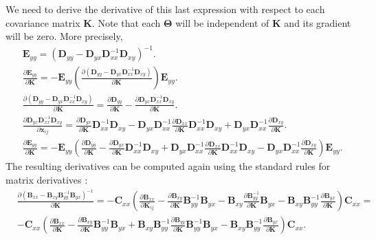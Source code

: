 We need to derive the derivative of this last expression with respect to each covariance matrix $\mathbf{K}$. Note that each $\mathbf{\Theta}$ will be independent of $\mathbf{K}$ and its gradient will be zero. 
More precisely, 
\begin{align}
& \mathbf{E}_{yy} = (\mathbf{D}_{yy}-\mathbf{D}_{yx}\mathbf{D}_{xx}^{-1}\mathbf{D}_{xy})^{-1}. \\
& \frac{\partial \mathbf{E}_{yy}}{\partial \mathbf{K}} = - \mathbf{E}_{yy} ( \frac{\partial (\mathbf{D}_{yy}-\mathbf{D}_{yx}\mathbf{D}_{xx}^{-1}\mathbf{D}_{xy})} {\partial \mathbf{K}}) \mathbf{E}_{yy}. \\
& \frac{\partial (\mathbf{D}_{yy}-\mathbf{D}_{yx}\mathbf{D}_{xx}^{-1}\mathbf{D}_{xy})} {\partial \mathbf{K}} = \frac{\partial \mathbf{D}_{yy}}{\partial \mathbf{K}} - \frac{\partial \mathbf{D}_{yx}\mathbf{D}_{xx}^{-1}\mathbf{D}_{xy}}{\partial \mathbf{K}}. \\
& \frac{\partial \mathbf{D}_{yx}\mathbf{D}_{xx}^{-1}\mathbf{D}_{xy}}{\partial \mathbf{x}_{ij}} = \frac{\partial \mathbf{D}_{yx}}{\partial \mathbf{K}} \mathbf{D}_{xx}^{-1}\mathbf{D}_{xy} - \mathbf{D}_{yx} \mathbf{D}_{xx}^{-1} \frac{\partial \mathbf{D}_{xx}}{\partial \mathbf{K}}\mathbf{D}_{xx}^{-1}\mathbf{D}_{xy}+ \mathbf{D}_{yx}\mathbf{D}_{xx}^{-1}\frac{\partial \mathbf{D}_{xy}}{\partial \mathbf{K}}. \\
& \frac{\partial \mathbf{E}_{yy}}{\partial \mathbf{K}} = - \mathbf{E}_{yy} (\frac{\partial \mathbf{D}_{yy}}{\partial \mathbf{K}} - \frac{\partial \mathbf{D}_{yx}}{\partial \mathbf{K}} \mathbf{D}_{xx}^{-1}\mathbf{D}_{xy} + \mathbf{D}_{yx} \mathbf{D}_{xx}^{-1} \frac{\partial \mathbf{D}_{xx}}{\partial \mathbf{K}}\mathbf{D}_{xx}^{-1}\mathbf{D}_{xy} - \mathbf{D}_{yx}\mathbf{D}_{xx}^{-1}\frac{\partial \mathbf{D}_{xy}}{\partial \mathbf{K}}) \mathbf{E}_{yy}.
\end{align}
The resulting derivatives can be computed again using the standard rules for matrix derivatives \cite{petersen2012}:
\begin{align}
& \frac{\partial (\mathbf{B}_{xx}-\mathbf{B}_{xy}\mathbf{B}_{yy}^{-1}\mathbf{B}_{yx})^{-1}}{\partial \mathbf{K}} =  -\mathbf{C}_{xx}(\frac{\partial \mathbf{B}_{xx}}{\partial \mathbf{K}_{ij}} - \frac{\partial \mathbf{B}_{xy}}{\partial \mathbf{K}}\mathbf{B}_{yy}^{-1}\mathbf{B}_{yx} - \mathbf{B}_{xy}\frac{\partial \mathbf{B}_{yy}^{-1}}{\partial \mathbf{K}}\mathbf{B}_{yx} - \mathbf{B}_{xy}\mathbf{B}_{yy}^{-1}\frac{\partial \mathbf{B}_{yx}}{\partial \mathbf{K}})\mathbf{C}_{xx} = \nonumber \\
& -\mathbf{C}_{xx}(\frac{\partial \mathbf{B}_{xx}}{\partial \mathbf{K}} - \frac{\partial \mathbf{B}_{xy}}{\partial \mathbf{K}}\mathbf{B}_{yy}^{-1}\mathbf{B}_{yx} + \mathbf{B}_{xy}\mathbf{B}_{yy}^{-1} \frac{\partial \mathbf{B}_{yy}}{\partial \mathbf{K}} \mathbf{B}_{yy}^{-1}\mathbf{B}_{yx} - \mathbf{B}_{xy}\mathbf{B}_{yy}^{-1}\frac{\partial \mathbf{B}_{yx}}{\partial \mathbf{K}})\mathbf{C}_{xx} .
\end{align}
